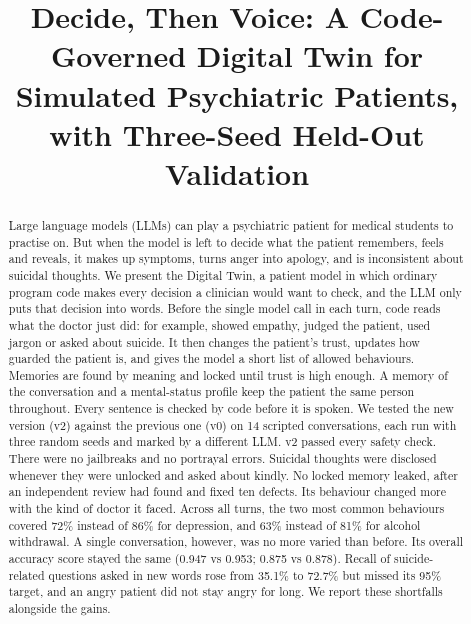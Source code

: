 \documentclass[conference]{IEEEtran}
\begin{document}
\title{Decide, Then Voice: A Code-Governed Digital Twin for Simulated Psychiatric Patients, with Three-Seed Held-Out Validation}

\author{
}

\maketitle

\begin{abstract}
Large language models (LLMs) can play a psychiatric patient for medical students to practise on. But when the model is left to
decide what the patient remembers, feels and reveals, it makes up symptoms, turns anger into apology, and is inconsistent about
suicidal thoughts. We present the Digital Twin, a patient model in which ordinary program code makes every decision a clinician would
want to check, and the LLM only puts that decision into words. Before the single model call in each turn, code reads what the doctor just did: for example, showed empathy, judged the patient, used jargon or asked about suicide. It then changes the patient's trust, updates how guarded the patient is, and gives the model a short list of allowed behaviours. Memories are found by meaning and locked until trust is
high enough. A memory of the conversation and a mental-status profile keep the patient the same person throughout. Every sentence is
checked by code before it is spoken. We tested the new version (v2) against the previous one (v0) on 14 scripted conversations, each run
with three random seeds and marked by a different LLM. v2 passed every safety check. There were no jailbreaks and no portrayal errors. Suicidal thoughts were disclosed whenever they were unlocked and asked about kindly. No locked memory leaked, after an independent review had found and fixed ten defects.
Its behaviour changed more with the kind of doctor it faced. Across all turns, the two most common behaviours covered 72\% instead of 86\% for depression, and 63\% instead of 81\% for alcohol withdrawal. A single conversation, however, was no more varied than before. Its overall accuracy score stayed the same (0.947 vs 0.953; 0.875 vs 0.878). Recall of
suicide-related questions asked in new words rose from 35.1\% to 72.7\% but missed its 95\% target, and an angry patient did not stay angry
for long. We report these shortfalls alongside the gains.
\end{abstract}
\end{document}
